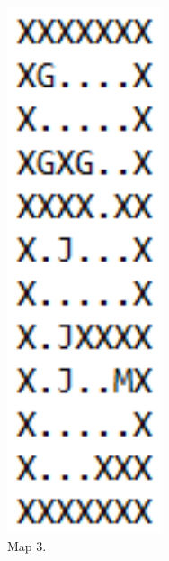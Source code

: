 \documentclass[../report.tex]{subfiles}
\begin{document}
\begin{figure}[H]
\begin{subfigure}[b]{0.19\textwidth}
        \includegraphics[width=0.5\textwidth]{figures/solver_design/map3.png}
        \captionsetup{width=0.9\textwidth}
        \caption{Map 3.}
        \label{subfig:map3}
    \end{subfigure}
    \begin{subfigure}[b]{0.19\textwidth}
        \centering

\end{subfigure}
\end{figure}
\end{document}
